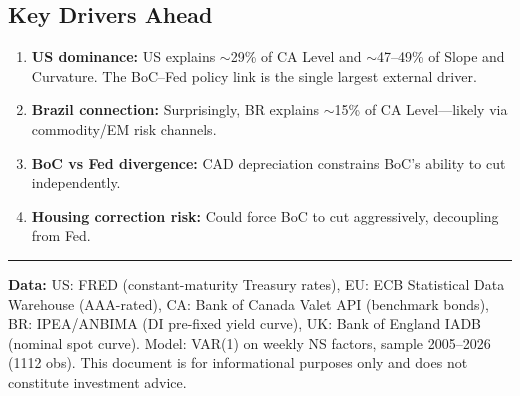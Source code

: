 \documentclass[11pt,a4paper]{article}
\begin{document}
\subsection*{Key Drivers Ahead}
\begin{enumerate}[nosep, leftmargin=1.4em]
    \item \textbf{US dominance:} US explains $\sim$29\% of CA Level and $\sim$47--49\% of Slope and Curvature. The BoC--Fed policy link is the single largest external driver.
    \item \textbf{Brazil connection:} Surprisingly, BR explains $\sim$15\% of CA Level---likely via commodity/EM risk channels.
    \item \textbf{BoC vs Fed divergence:} CAD depreciation constrains BoC's ability to cut independently.
    \item \textbf{Housing correction risk:} Could force BoC to cut aggressively, decoupling from Fed.
\end{enumerate}


\vspace{0.3cm}
\noindent\rule{\textwidth}{0.4pt}
{\footnotesize\color{biggrey} \textbf{Data:} US: FRED (constant-maturity Treasury rates), EU: ECB Statistical Data Warehouse (AAA-rated), CA: Bank of Canada Valet API (benchmark bonds), BR: IPEA/ANBIMA (DI pre-fixed yield curve), UK: Bank of England IADB (nominal spot curve). Model: VAR(1) on weekly NS factors, sample 2005--2026 (1112 obs). This document is for informational purposes only and does not constitute investment advice.}
\end{document}
